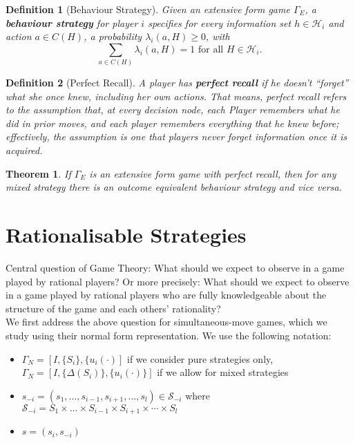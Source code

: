 \documentclass[12pt]{extreport} %
\theoremstyle{named}
\theoremstyle{itshape}
\newtheorem{theorem}[unnamedtheorem]{Theorem}
\newtheorem*{definition}{Definition}
\theoremstyle{normal}
\begin{document}
\begin{definition}[Behaviour Strategy]
	Given an extensive form game $\Gamma_E$, a \textbf{behaviour strategy} for player $i$ specifies for every information set $h \in \mathcal{H}_i$ and action $a \in C(H)$, a probability $\lambda_i(a, H) \geq 0$, with
	$$ \sum_{a \in C(H)} \lambda_i(a, H) = 1 \text{ for all } H \in \mathcal{H}_i. $$
\end{definition}

\begin{definition}[Perfect Recall]
	A player has \textbf{perfect recall} if he doesn't \enquote{forget} what she once knew, including her own actions. That means, perfect recall refers to the assumption that, at every decision node, each Player remembers what he did in prior moves, and each player remembers everything that he knew before; effectively, the assumption is one that players never forget information once it is acquired.
\end{definition}

\begin{theorem}
	If $\Gamma_E$ is an extensive form game with perfect recall, then for any mixed strategy there is an outcome equivalent behaviour strategy and vice versa.	
\end{theorem}

\section{Rationalisable Strategies}

Central question of Game Theory: What should we expect to observe in a game played by rational players? Or more precisely: What should we expect to observe in a game played by rational players who are fully knowledgeable about the structure of the game and each others' rationality? ~\\

We first address the above question for simultaneous-move games, which we study using their normal form representation. We use the following notation:
\begin{itemize}
	\item $\Gamma_N = [I, \{ S_i \}, \{ u_i(\cdot)]$ if we consider pure strategies only, ~\\
		$\Gamma_{N} = [I, \{ \Delta(S_i)\}, \{ u_i(\cdot) \}]$ if we allow for mixed strategies
	\item $s_{-i} = (s_1, \dotsc, s_{i-1}, s_{i+1}, \dotsc, s_l) \in \mathcal{S}_{-i}$ where $\mathcal{S}_{-i} = S_1 \times \dotsc \times S_{i-1} \times S_{i+1} \times \cdots \times S_{l}$
	\item $s = (s_i, s_{-i})$
\end{itemize}
\end{document}
